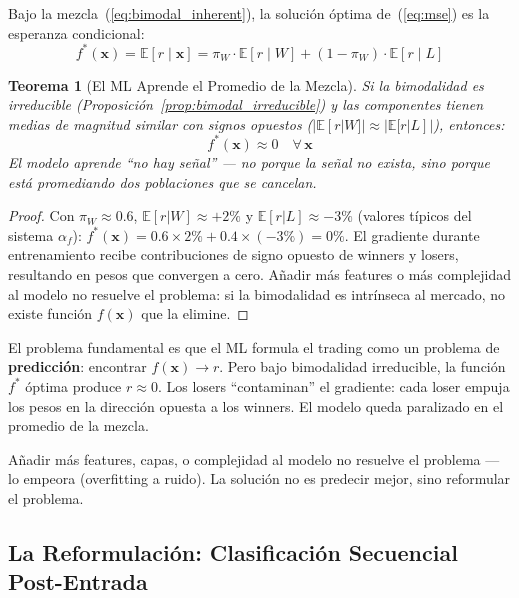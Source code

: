 \documentclass[11pt,a4paper]{article}
\newtheorem{theorem}{Teorema}[section]
\newcommand{\E}{\mathbb{E}}
\newcommand{\af}{\alpha_f}
\begin{document}
Bajo la mezcla~(\ref{eq:bimodal_inherent}), la soluci\'on \'optima
de~(\ref{eq:mse}) es la esperanza condicional:
\begin{equation}
f^*(\bm{x}) = \E[r \mid \bm{x}]
  = \pi_W \cdot \E[r \mid W] + (1 - \pi_W) \cdot \E[r \mid L]
\label{eq:ml_optimal}
\end{equation}

\begin{theorem}[El ML Aprende el Promedio de la Mezcla]
\label{thm:ml_fails}
Si la bimodalidad es irreducible (Proposici\'on~\ref{prop:bimodal_irreducible})
y las componentes tienen medias de magnitud similar con signos opuestos
($|\E[r|W]| \approx |\E[r|L]|$), entonces:
\begin{equation}
f^*(\bm{x}) \approx 0 \quad \forall\, \bm{x}
\end{equation}
El modelo aprende ``no hay se\~nal'' --- no porque la se\~nal no
exista, sino porque est\'a promediando dos poblaciones que se cancelan.
\end{theorem}

\begin{proof}
Con $\pi_W \approx 0.6$, $\E[r|W] \approx +2\%$ y
$\E[r|L] \approx -3\%$ (valores t\'ipicos del sistema $\af$):
$f^*(\bm{x}) = 0.6 \times 2\% + 0.4 \times (-3\%) = 0\%$.
El gradiente durante entrenamiento recibe contribuciones de signo
opuesto de winners y losers, resultando en pesos que convergen
a cero. A\~nadir m\'as features o m\'as complejidad al modelo no
resuelve el problema: si la bimodalidad es intr\'inseca al mercado,
no existe funci\'on $f(\bm{x})$ que la elimine.
\end{proof}

\begin{tcolorbox}[redbox, title=Diagn\'ostico: Por Qu\'e el ML No Aprende]
El problema fundamental es que el ML formula el trading como un
problema de \textbf{predicci\'on}: encontrar $f(\bm{x}) \to r$.
Pero bajo bimodalidad irreducible, la funci\'on $f^*$ \'optima
produce $r \approx 0$. Los losers ``contaminan'' el gradiente:
cada loser empuja los pesos en la direcci\'on opuesta a los winners.
El modelo queda paralizado en el promedio de la mezcla.

A\~nadir m\'as features, capas, o complejidad al modelo no resuelve
el problema --- lo empeora (overfitting a ruido). La soluci\'on no
es predecir mejor, sino reformular el problema.
\end{tcolorbox}


\subsection{La Reformulaci\'on: Clasificaci\'on Secuencial Post-Entrada}
\end{document}
